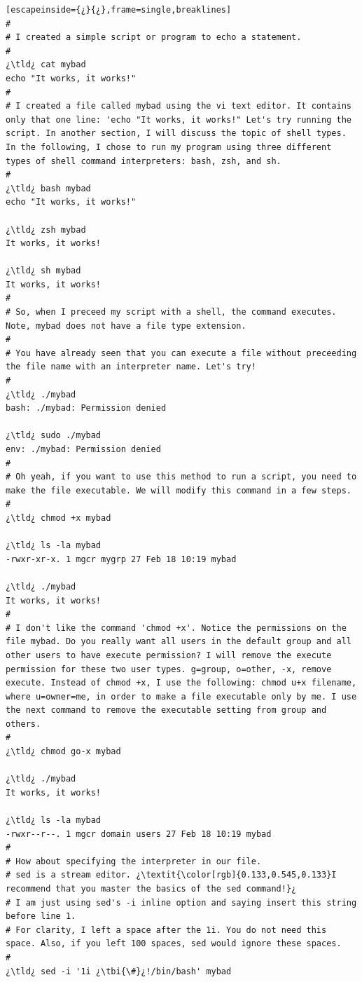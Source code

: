 \begin{lstlisting}[escapeinside={¿}{¿},frame=single,breaklines]
#
# I created a simple script or program to echo a statement.
#
¿\tld¿ cat mybad
echo "It works, it works!"
#
# I created a file called mybad using the vi text editor. It contains only that one line: 'echo "It works, it works!" Let's try running the script. In another section, I will discuss the topic of shell types. In the following, I chose to run my program using three different types of shell command interpreters: bash, zsh, and sh.
#
¿\tld¿ bash mybad
echo "It works, it works!"

¿\tld¿ zsh mybad
It works, it works!

¿\tld¿ sh mybad
It works, it works!
#
# So, when I preceed my script with a shell, the command executes. Note, mybad does not have a file type extension.
#
# You have already seen that you can execute a file without preceeding the file name with an interpreter name. Let's try!
#
¿\tld¿ ./mybad
bash: ./mybad: Permission denied

¿\tld¿ sudo ./mybad
env: ./mybad: Permission denied
#
# Oh yeah, if you want to use this method to run a script, you need to make the file executable. We will modify this command in a few steps.
#
¿\tld¿ chmod +x mybad

¿\tld¿ ls -la mybad
-rwxr-xr-x. 1 mgcr mygrp 27 Feb 18 10:19 mybad

¿\tld¿ ./mybad
It works, it works!
#
# I don't like the command 'chmod +x'. Notice the permissions on the file mybad. Do you really want all users in the default group and all other users to have execute permission? I will remove the execute permission for these two user types. g=group, o=other, -x, remove execute. Instead of chmod +x, I use the following: chmod u+x filename, where u=owner=me, in order to make a file executable only by me. I use the next command to remove the executable setting from group and others.
#
¿\tld¿ chmod go-x mybad

¿\tld¿ ./mybad
It works, it works!

¿\tld¿ ls -la mybad
-rwxr--r--. 1 mgcr domain users 27 Feb 18 10:19 mybad
#
# How about specifying the interpreter in our file.
# sed is a stream editor. ¿\textit{\color[rgb]{0.133,0.545,0.133}I recommend that you master the basics of the sed command!}¿ 
# I am just using sed's -i inline option and saying insert this string before line 1.
# For clarity, I left a space after the 1i. You do not need this space. Also, if you left 100 spaces, sed would ignore these spaces.
#
¿\tld¿ sed -i '1i ¿\tbi{\#}¿!/bin/bash' mybad


\end{lstlisting}
